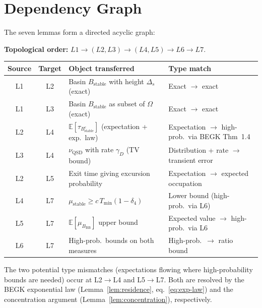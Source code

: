 \documentclass[11pt]{article}
\newcommand{\Ds}{\Delta_s}
\newcommand{\Bstable}{B_{\mathrm{stable}}}
\newcommand{\BBB}{B_{\mathrm{BB}}}
\newcommand{\QSD}{\mathrm{QSD}}
\newcommand{\muBB}{\mu_{\BBB}}
\begin{document}
\section{Dependency Graph}
\label{sec:dependency}

The seven lemmas form a directed acyclic graph:

\medskip
\noindent\textbf{Topological order:}
$L1 \to (L2, L3) \to (L4, L5) \to L6 \to L7$.

\medskip
\begin{center}
\renewcommand{\arraystretch}{1.4}
\begin{tabular}{|c|c|p{5cm}|p{3.5cm}|}
\hline
\textbf{Source} & \textbf{Target} & \textbf{Object transferred}
  & \textbf{Type match} \\
\hline\hline
L1 & L2 &
  Basin $\Bstable$ with height $\Ds$ (exact) &
  Exact $\to$ exact \\
\hline
L1 & L3 &
  Basin $\Bstable$ as subset of $\Omega$ (exact) &
  Exact $\to$ exact \\
\hline
L2 & L4 &
  $\mathbb{E}[\tau_{\Bstable^c}]$ (expectation + exp.\ law) &
  Expectation $\to$ high-prob.\ via BEGK Thm~1.4 \\
\hline
L3 & L4 &
  $\nu_\QSD$ with rate $\gamma_D$ (TV bound) &
  Distribution + rate $\to$ transient error \\
\hline
L2 & L5 &
  Exit time giving excursion probability &
  Expectation $\to$ expected occupation \\
\hline
L4 & L7 &
  $\mu_{\mathrm{stable}} \geq c\,T_{\min}(1-\delta_4)$ &
  Lower bound (high-prob.\ via L6) \\
\hline
L5 & L7 &
  $\mathbb{E}[\muBB]$ upper bound &
  Expected value $\to$ high-prob.\ via L6 \\
\hline
L6 & L7 &
  High-prob.\ bounds on both measures &
  High-prob.\ $\to$ ratio bound \\
\hline
\end{tabular}
\end{center}

\medskip\noindent
The two potential type mismatches (expectations flowing where
high-probability bounds are needed) occur at L2$\to$L4 and
L5$\to$L7.  Both are resolved by the BEGK exponential law
(Lemma~\ref{lem:residence}, eq.~\eqref{eq:exp-law}) and the
concentration argument (Lemma~\ref{lem:concentration}),
respectively.
\end{document}
